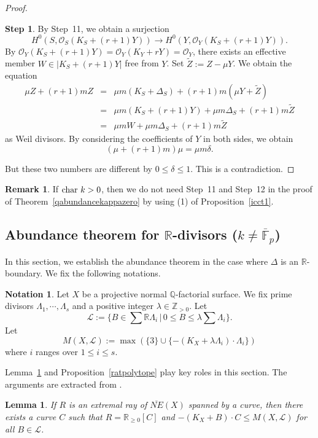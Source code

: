 \documentclass[12pt,twoside]{amsart}
\newtheorem{lem}[thm]{Lemma}
\theoremstyle{definition}
\newtheorem{rem}[thm]{Remark}
\newtheorem{nota}[thm]{Notation}
\newtheorem{step}{Step}
\newcommand{\Q}{$\mathbb{Q}$}
\begin{document}
\begin{proof}
\begin{step}
By Step~11, we obtain a surjection 
$$H^0(S, \mathcal O_S(K_S+(r+1)Y)) \to H^0(Y, \mathcal O_Y(K_S+(r+1)Y)).$$
By 
$
\mathcal{O}_Y(K_S+(r+1)Y)=
\mathcal{O}_Y(K_Y+rY)=
\mathcal{O}_Y
$, 
there exists an effective member $W\in |K_S+(r+1)Y|$ free from $Y$. 
Set $\tilde{Z}:=Z-\mu Y$. 
We obtain the equation 
\begin{eqnarray*}
\mu Z+(r+1)mZ
&=&\mu m(K_S+\Delta_S)+(r+1)m(\mu Y+\tilde{Z})\\
&=&\mu m(K_S+(r+1)Y)+\mu m\Delta_S+(r+1)m\tilde{Z}\\
&=&\mu mW+\mu m\Delta_S+(r+1)m\tilde{Z}
\end{eqnarray*}
as Weil divisors. 
By considering the coefficients of $Y$ in both sides, 
we obtain 
$$(\mu+(r+1)m)\mu=\mu m \delta. $$
\end{step}
But these two numbers are different by $0 \leq \delta \leq 1$. 
This is a contradiction. 
\end{proof}


\begin{rem}
If ${\rm char}~k>0$, then we do not need 
Step~11 and Step~12 in the proof of 
Theorem~\ref{qabundancekappazero} 
by using (1) of Proposition~\ref{icct1}. 
\end{rem}


\subsection{Abundance theorem for $\mathbb{R}$-divisors ($k\neq\overline{\mathbb F}_p$)}

In this section, we establish the abundance theorem 
in the case where $\Delta$ is an $\mathbb{R}$-boundary. 
We fix the following notations. 

\begin{nota}
Let $X$ be a projective normal \Q-factorial surface. 
We fix prime divisors $\Lambda_1,\cdots, \Lambda_s$ and 
a positive integer $\lambda\in\mathbb Z_{>0}$. 
Let 
$$\mathcal{L}:=\{B\in \sum\mathbb{R}\Lambda_i\,|\,0\leq B\leq \lambda\sum \Lambda_i\}.$$
Let 
$$M(X, \mathcal{L}):=\max (\{3\}\cup \{-(K_X+\lambda\Lambda_{i})\cdot \Lambda_{i}\})$$ 
where $i$ ranges over $1\leq i\leq s$. 
\end{nota}

Lemma~\ref{extlengthlem} and Proposition~\ref{ratpolytope} 
play key roles in this section.
The arguments are extracted from \cite[Section 3]{Birkar}. 

\begin{lem}\label{extlengthlem}
If $R$ is an extremal ray of $\overline{NE}(X)$ spanned by a curve, 
then there exists a curve $C$ such that $R=\mathbb{R}_{\geq 0}[C]$ and 
$-(K_X+B)\cdot C \leq M(X, \mathcal{L})$ for 
all $B\in \mathcal{L}$. 
\end{lem}
\end{document}
